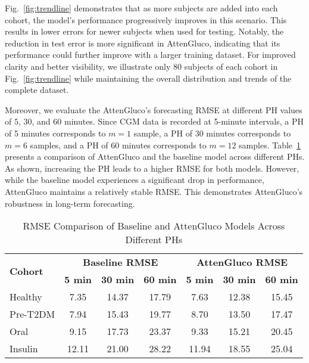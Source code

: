 Fig.~\ref{fig:trendline} demonstrates that as more subjects are added into each cohort, the model's performance progressively improves in this scenario. This results in lower errors for newer subjects when used for testing. Notably, the reduction in test error is more significant in AttenGluco, indicating that its performance could further improve with a larger training dataset. For improved clarity and better visibility, we illustrate only 80 subjects of each cohort in Fig.~\ref{fig:trendline} while maintaining the overall distribution and trends of the complete dataset.

Moreover, we evaluate the AttenGluco's forecasting RMSE at different PH values of $5$, $30$, and $60$ minutes. Since CGM data is recorded at 5-minute intervals, a PH of 5 minutes corresponds to \( m = 1 \) sample, a PH of 30 minutes corresponds to \( m = 6 \) samples, and a PH of 60 minutes corresponds to \( m = 12 \) samples. Table~\ref{tab:rmse_comparison} presents a comparison of AttenGluco and the baseline model across different PHs. As shown, increasing the PH leads to a higher RMSE for both models. However, while the baseline model experiences a significant drop in performance, AttenGluco maintains a relatively stable RMSE. This demonstrates AttenGluco's robustness in long-term forecasting.
\begin{table}[h]
\vspace{-1.5mm}
    \centering
    \renewcommand{\arraystretch}{1.2} %
    \setlength{\tabcolsep}{8pt} %
    \caption{\small RMSE Comparison of Baseline and AttenGluco Models Across Different PHs}
    \label{tab:rmse_comparison}
     \begin{adjustbox}{max width=\columnwidth}
    \begin{tabular}{|l|ccc|ccc|}
        \hline
        \multirow{2}{*}{\textbf{Cohort}} & \multicolumn{3}{c|}{\textbf{Baseline RMSE}} & \multicolumn{3}{c|}{\textbf{AttenGluco RMSE}} \\
        & \textbf{5 min} & \textbf{30 min} & \textbf{60 min} & \textbf{5 min} & \textbf{30 min} & \textbf{60 min} \\
        \hline
        Healthy        & 7.35  & 14.37  & 17.79  & 7.63  & 12.38  & 15.45 \\
        Pre-T2DM   & 7.94  & 15.43  & 19.77  & 8.70  & 13.50  & 17.47 \\
        Oral           & 9.15  & 17.73  & 23.37  & 9.33  & 15.21  & 20.45 \\
        Insulin        & 12.11 & 21.00  & 28.22  & 11.94 & 18.55  & 25.04 \\
        \hline
    \end{tabular}
    \end{adjustbox}
\end{table}
